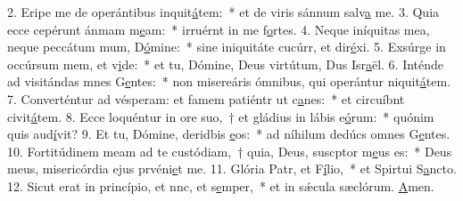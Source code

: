 2. Eripe me de operántibus inquit\uline{á}tem:~* et de viris sánnum salv\uline{a} me.
3. Quia ecce cepérunt ánmam m\uline{e}am:~* irruérnt in me f\uline{o}rtes.
4. Neque iníquitas mea, neque peccátum mum, D\uline{ó}mine:~* sine iniquitáte cucúrr, et dir\uline{é}xi.
5. Exsúrge in occúrsum mem, et v\uline{i}de:~* et tu, Dómine, Deus virtútum, Dus Isr\uline{a}ël.
6. Inténde ad visitándas mnes G\uline{e}ntes:~* non misereáris ómnibus, qui operántur niquit\uline{á}tem.
7. Converténtur ad vésperam: et famem patiéntr ut c\uline{a}nes:~* et circuíbnt civit\uline{á}tem.
8. Ecce loquéntur in ore suo,~† et gládius in lábis e\uline{ó}rum:~* quónim quis aud\uline{í}vit?
9. Et tu, Dómine, deridbis \uline{e}os:~* ad níhilum dedúcs omnes G\uline{e}ntes.
10. Fortitúdinem meam ad te custódiam,~† quia, Deus, suscptor m\uline{e}us es:~* Deus meus, misericórdia ejus prvéni\uline{e}t me.
11. Glória Patr, et F\uline{í}lio,~* et Spirtui S\uline{a}ncto.
12. Sicut erat in princípio, et nnc, et s\uline{e}mper,~* et in sǽcula sæclórum. \uline{A}men.
